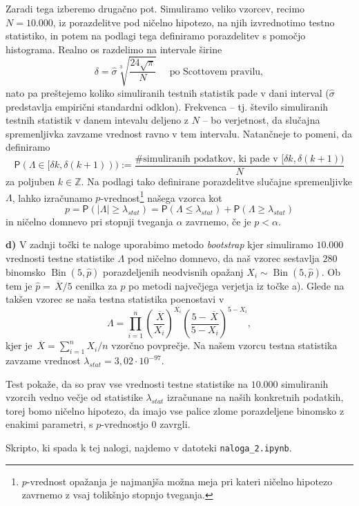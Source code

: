 \documentclass[a4paper,11pt]{article}
\newcommand{\olsi}[1]{\,\overline{\!{#1}}} %
\newcommand{\sumin}{\sum_{i = 1}^n}
\newcommand{\prob}{\mathsf{P}}
\newcommand{\Z}{\mathbb{Z}}
\DeclareMathOperator{\bin}{Bin}
\begin{document}
Zaradi tega izberemo drugačno pot. Simuliramo veliko vzorcev, recimo $N = 10.000$, iz porazdelitve pod ničelno hipotezo, na njih izvrednotimo testno statistiko, in potem na podlagi tega definiramo porazdelitev s pomočjo histograma. Realno os razdelimo na intervale širine 
\[
    \delta = \hat{\sigma} \sqrt[3]{\frac{24\sqrt{\pi}}{N}} \quad \text{ po Scottovem pravilu},
\]  
nato pa preštejemo koliko simuliranih testnih statistik pade v dani interval ($\hat{\sigma}$ predstavlja empirični standardni odklon).  Frekvenca -- tj. število simuliranih testnih statistik v danem intevalu deljeno z $N$ -- bo verjetnost, da slučajna spremenljivka zavzame vrednost ravno v tem intervalu. Natančneje to pomeni, da definiramo
\[
    \prob(\Lambda \in [\delta k, \delta(k+1))) := \frac{\text{\# simuliranih podatkov, ki pade v $[\delta k, \delta(k+1))$}}{N}
\]
za poljuben $k \in \Z$. Na podlagi tako definirane porazdelitve slučajne spremenljivke $\Lambda$, lahko izračunamo $p$-vrednost\footnote{$p$-vrednost opažanja je najmanjša možna meja pri kateri ničelno hipotezo zavrnemo z vsaj tolikšnjo stopnjo tveganja.} našega vzorca kot
\[
    p = \prob(\left\lvert \Lambda \right\rvert \geq \lambda_{stat}) = \prob(\Lambda \leq \lambda_{stat}) + \prob(\Lambda \geq \lambda_{stat})
\]
in ničelno domnevo pri stopnji tveganja $\alpha$ zavrnemo, če je $p < \alpha$.
\newline

\noindent
\textbf{d) } V zadnji točki te naloge uporabimo metodo \emph{bootstrap} kjer simuliramo $10.000$ vrednosti testne statistike $\Lambda$ pod ničelno domnevo, da naš vzorec sestavlja $280$ binomsko $\bin(5, \hat{p})$ porazdeljenih neodvisnih opažanj $X_i \sim \bin(5, \hat{p})$. Ob tem je $\hat{p} = \olsi{X}/5$ cenilka za $p$ po metodi največjega verjetja iz točke a). Glede na takšen vzorec se naša testna statistika poenostavi v 
\[
    \Lambda = \prod_{i = 1}^n \left(\frac{\olsi{X}}{X_i}\right)^{X_i} \left( \frac{5 - \olsi{X}}{5 - X_i}\right)^{5 - X_i},
\]
kjer je $\olsi{X} = \sumin X_i/n$ vzorčno povprečje. Na našem vzorcu testna statistika zavzame vrednost $\lambda_{stat} = 3,02 \cdot 10^{-97}$.

Test pokaže, da so prav vse vrednosti testne statistike na $10.000$ simuliranih vzorcih vedno večje od statistike $\lambda_{stat}$ izračunane na naših konkretnih podatkih, torej bomo ničelno hipotezo, da imajo vse palice zlome porazdeljene binomsko z enakimi parametri, s $p$-vrednostjo $0$ zavrgli.

Skripto, ki spada k tej nalogi, najdemo v datoteki \texttt{naloga\_2.ipynb}.
\end{document}
